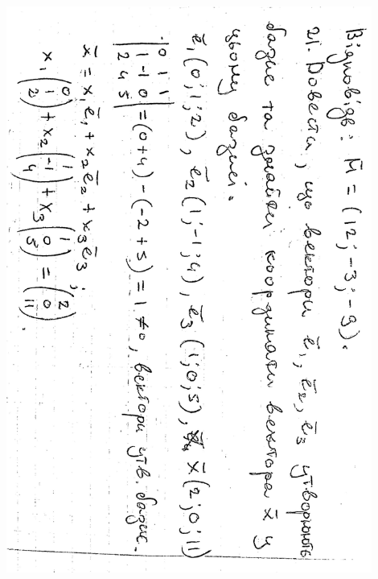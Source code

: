\documentclass{article}
\begin{document}
\includegraphics[width=12cm,angle=90]{ons/15.jpg}\\
\end{document}
